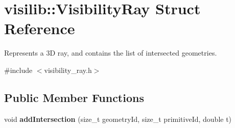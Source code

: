 \hypertarget{structvisilib_1_1_visibility_ray}{}\section{visilib\+::Visibility\+Ray Struct Reference}
\label{structvisilib_1_1_visibility_ray}


Represents a 3D ray, and contains the list of intersected geometries. 




{\ttfamily \#include $<$visibility\+\_\+ray.\+h$>$}

\subsection*{Public Member Functions}
\begin{DoxyCompactItemize}
\item 
\mbox{\label{structvisilib_1_1_visibility_ray_abdcc6b677206ac4226530a32f3ce58ec}} 
void {\bfseries add\+Intersection} (size\+\_\+t geometry\+Id, size\+\_\+t primitive\+Id, double t)
\end{DoxyCompactItemize}
